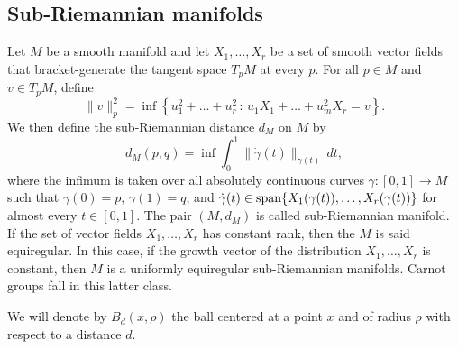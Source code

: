 \documentclass[12pt]{amsart}
\newtheorem{lemma}{Lemma}[section]
\newtheorem{definition}{Definition}[section]
\begin{document}


\subsection{Sub-Riemannian manifolds}
Let $M$ be a smooth manifold and let $ X_1,\dots, X_r$ be a set of smooth vector fields that bracket-generate the tangent space $T_pM$ at every $p$. For all $p\in M$ and $v\in T_pM$, define
$$
\|v\|^2_p = \inf \left\{u_1^2+\dots +u_r^2 \,:\, u_1 X_1 +\dots+u_m^2 X_r=v\right\}.
$$
We then define the sub-Riemannian distance $d_M$ on $M$ by
$$
d_M(p,q) = \inf\int_0^1  \|  \dot\gamma(t)\|_{\gamma(t)}   \,dt ,
$$
where the infimum is taken over all absolutely continuous curves $\gamma :[0,1]\to M$ such that $\gamma(0)=p$, $\gamma(1)=q$, and $\dot\gamma(t)\in {\rm span}\{X_1(\gamma(t)),\dots, X_r(\gamma(t))\}$ for almost every $t\in [0,1]$. The pair $(M,d_M)$ is called sub-Riemannian manifold.
If the set of vector fields $X_1,\dots, X_r$ has constant rank, then the $M$ is said equiregular. In this case, if the growth vector of the distribution $X_1,\dots, X_r$ is constant, then $M$ is a uniformly equiregular sub-Riemannian manifolds. Carnot groups fall in this latter class. 

We will denote by $B_d(x,\rho)$ the  ball centered at a point $x$ and of radius $\rho$ with respect to a distance $d$.
\end{document}
